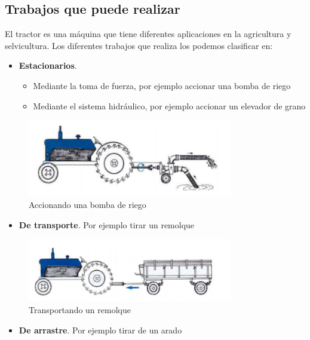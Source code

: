 \documentclass[a4paper,12pt,oneside]{article}
\begin{document}
\subsection{Trabajos que puede realizar}
\label{sec:orgda6ac81}
El tractor es una máquina que tiene diferentes aplicaciones en la agricultura y
selvicultura. Los diferentes trabajos que realiza los podemos clasificar en:
\begin{itemize}
\item \textbf{Estacionarios}.
\begin{itemize}
\item Mediante la toma de fuerza, por ejemplo accionar una bomba de riego
\item Mediante el sistema hidráulico, por ejemplo accionar un elevador de grano
\end{itemize}
\end{itemize}
\begin{center}
\begin{figure}[htbp]
\centering
\includegraphics[width=0.8\textwidth]{./img_0009/tractor_riego.PNG}
\caption{Accionando una bomba de riego}
\end{figure}
\end{center}
\begin{itemize}
\item \textbf{De transporte}. Por ejemplo tirar un remolque
\end{itemize}
\begin{center}
\begin{figure}[htbp]
\centering
\includegraphics[width=0.8\textwidth]{./img_0009/tractor_remolque.PNG}
\caption{Transportando un remolque}
\end{figure}
\end{center}
\begin{itemize}
\item \textbf{De arrastre}. Por ejemplo tirar de un arado
\end{itemize}
\end{document}
